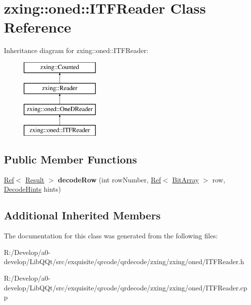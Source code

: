 \hypertarget{classzxing_1_1oned_1_1_i_t_f_reader}{}\section{zxing\+:\+:oned\+:\+:I\+T\+F\+Reader Class Reference}
\label{classzxing_1_1oned_1_1_i_t_f_reader}
Inheritance diagram for zxing\+:\+:oned\+:\+:I\+T\+F\+Reader\+:\begin{figure}[H]
\begin{center}
\leavevmode
\includegraphics[height=4.000000cm]{classzxing_1_1oned_1_1_i_t_f_reader}
\end{center}
\end{figure}
\subsection*{Public Member Functions}
\begin{DoxyCompactItemize}
\item 
\mbox{\label{classzxing_1_1oned_1_1_i_t_f_reader_aaceb247cd9cb5524ee213cb8f88a48a1}} 
\mbox{\hyperlink{classzxing_1_1_ref}{Ref}}$<$ \mbox{\hyperlink{classzxing_1_1_result}{Result}} $>$ {\bfseries decode\+Row} (int row\+Number, \mbox{\hyperlink{classzxing_1_1_ref}{Ref}}$<$ \mbox{\hyperlink{classzxing_1_1_bit_array}{Bit\+Array}} $>$ row, \mbox{\hyperlink{classzxing_1_1_decode_hints}{Decode\+Hints}} hints)
\end{DoxyCompactItemize}
\subsection*{Additional Inherited Members}


The documentation for this class was generated from the following files\+:\begin{DoxyCompactItemize}
\item 
R\+:/\+Develop/a0-\/develop/\+Lib\+Q\+Qt/src/exquisite/qrcode/qrdecode/zxing/zxing/oned/I\+T\+F\+Reader.\+h\item 
R\+:/\+Develop/a0-\/develop/\+Lib\+Q\+Qt/src/exquisite/qrcode/qrdecode/zxing/zxing/oned/I\+T\+F\+Reader.\+cpp\end{DoxyCompactItemize}
